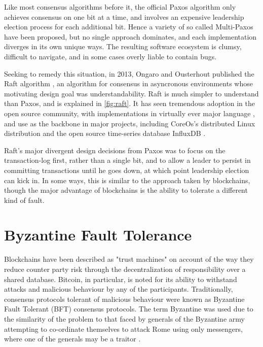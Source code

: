 Like most consensus algorithms before it, the official Paxos algorithm only achieves consensus on one bit at a time,
and involves an expensive leadership election process for each additional bit. 
Hence a variety of so called Multi-Paxos have been proposed, but no single approach dominates, 
and each implementation diverges in its own unique ways. 
The resulting software ecosystem is clumsy, difficult to navigate, and in some cases overly liable to contain bugs.

Seeking to remedy this situation, in 2013, Ongaro and Ousterhout published the Raft algorithm \cite{raft},
an algorithm for consensus in asyncronous environments whose motivating design goal was understandability.
Raft is much simpler to understand than Paxos, and is explained in \ref{fig:raft}. 
It has seen tremendous adoption in the open source community, with implementations in virtually ever major language \cite{raft.github.io},
and use as the backbone in major projects, including CoreOs's distributed Linux distribution \cite{coreos_raft} and the open source time-series database InfluxDB \cite{influxdb_raft}.

Raft's major divergent design decisions from Paxos was to focus on the transaction-log first, rather than a single bit,
and to allow a leader to persist in committing transactions until he goes down, at which point leadership election can kick in. 
In some ways, this is similar to the approach taken by blockchains, 
though the major advantage of blockchains is the ability to tolerate a different kind of fault.

\section{Byzantine Fault Tolerance}

Blockchains have been described as "trust machines" \cite{economist_blockchains} on account of the way they reduce counter party risk through the decentralization of responsibility over a shared database.
Bitcoin, in particular, is noted for its ability to withstand attacks and malicious behaviour by any of the participants. 
Traditionally, consensus protocols tolerant of malicious behaviour were known as Byzantine Fault Tolerant (BFT) consensus protocols.
The term Byzantine was used due to the similarity of the problem to that faced by generals of the Byzantine army attempting to co-ordinate themselves to attack Rome using only messengers,
where one of the generals may be a traitor \cite{lamport1982Byzantine}.

